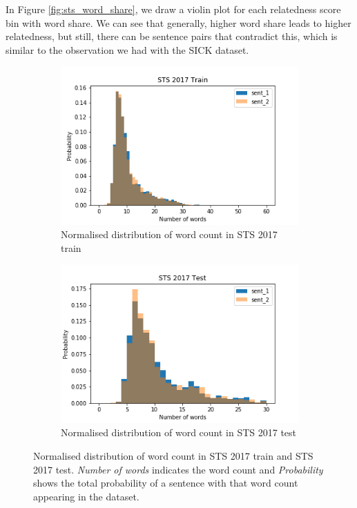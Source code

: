 \begin{enumerate}
In Figure \ref{fig:sts_word_share}, we draw a violin plot for each relatedness score bin with word share. We can see that generally, higher word share leads to higher relatedness, but still, there can be sentence pairs that contradict this, which is similar to the observation we had with the SICK dataset. 


\begin{figure}
	\captionsetup[subfigure]{justification=centering}
	\centering
	\begin{subfigure}[b]{.5\textwidth}
		\centering
		\includegraphics[width=\textwidth]{figures/semantic_textual_similarity/introduction/sts_2017_train_words.png}
		\caption{Normalised distribution of word count in STS 2017 train}
		\label{fig:sts_train_words}
	\end{subfigure}%
	\begin{subfigure}[b]{.5\textwidth}
		\centering
		\includegraphics[width=\textwidth]{figures/semantic_textual_similarity/introduction/sts_2017_test_words.png}
		\caption{Normalised distribution of word count in STS 2017 test}
		\label{fig:sts_test_words}
	\end{subfigure}
	\caption[Normalised distribution of word count in STS 2017 train and STS 2017 test.]{Normalised distribution of word count in STS 2017 train and STS 2017 test. \textit{Number of words} indicates the word count and \textit{Probability} shows the total probability of a sentence with that word count appearing in the dataset.}
	\label{fig:sts_words}
\end{figure}


\end{enumerate}
